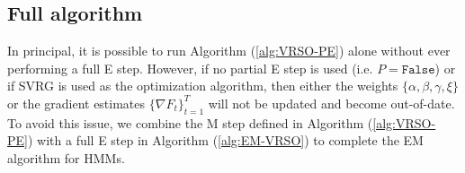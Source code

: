 

\subsection{Full algorithm}

In principal, it is possible to run Algorithm (\ref{alg:VRSO-PE}) alone without ever performing a full E step. However, if no partial E step is used (i.e. $P = \texttt{False}$) or if SVRG is used as the optimization algorithm, then either the weights $\{\alpha,\beta,\gamma,\xi\}$ or the gradient estimates $\{\nabla F_{t}\}_{t=1}^T$ will not be updated and become out-of-date. To avoid this issue, we combine the M step defined in Algorithm (\ref{alg:VRSO-PE}) with a full E step in Algorithm (\ref{alg:EM-VRSO}) to complete the EM algorithm for HMMs.

